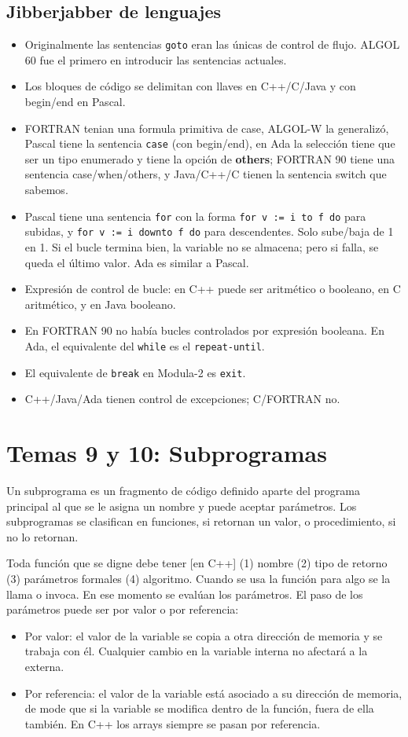 \documentclass[a4paper]{article}
\begin{document}
	 	\subsection{Jibberjabber de lenguajes}
	 \begin{itemize}
	 \item Originalmente las sentencias \verb|goto| eran las únicas de control de flujo. ALGOL 60 fue el primero en introducir las sentencias actuales.
	 \item Los bloques de código se delimitan con llaves en C++/C/Java y con begin/end en Pascal.
	 \item FORTRAN tenian una formula primitiva de case, ALGOL-W la generalizó, Pascal tiene la sentencia \verb|case| (con begin/end), en Ada la selección tiene que ser un tipo enumerado y tiene la opción de \textbf{others}; FORTRAN 90 tiene una sentencia case/when/others, y Java/C++/C tienen la sentencia switch que sabemos.
	 \item Pascal tiene una sentencia \verb|for| con la forma \verb|for v := i to f do| para subidas, y \verb|for v := i downto f do| para descendentes. Solo sube/baja de 1 en 1. Si el bucle termina bien, la variable no se almacena; pero si falla, se queda el último valor. Ada es similar a Pascal.
	 \item Expresión de control de bucle: en C++ puede ser aritmético o booleano, en C aritmético, y en Java booleano.
	 \item En FORTRAN 90 no había bucles controlados por expresión booleana. En Ada, el equivalente del \verb|while| es el \verb|repeat-until|.
	 \item El equivalente de \verb|break| en Modula-2 es \verb|exit|.
	 \item C++/Java/Ada tienen control de excepciones; C/FORTRAN no.
	 \end{itemize}
	 
	 \section{Temas 9 y 10: Subprogramas}	
	 Un subprograma es un fragmento de código definido aparte del programa principal al que se le asigna un nombre y puede aceptar parámetros. Los subprogramas se clasifican en funciones, si retornan un valor, o procedimiento, si no lo retornan. 
	 
	 Toda función que se digne debe tener [en C++] (1) nombre (2) tipo de retorno (3) parámetros formales (4) algoritmo. Cuando se usa la función para algo se la llama o invoca. En ese momento se evalúan los parámetros. El paso de los parámetros puede ser por valor o por referencia:
	 \begin{itemize}
	 	\item Por valor: el valor de la variable se copia a otra dirección de memoria y se trabaja con él. Cualquier cambio en la variable interna no afectará a la externa.
	 	\item Por referencia: el valor de la variable está asociado a su dirección de memoria, de mode que si la variable se modifica dentro de la función, fuera de ella también. En C++ los arrays siempre se pasan por referencia.
	 \end{itemize}
 
\end{document}

